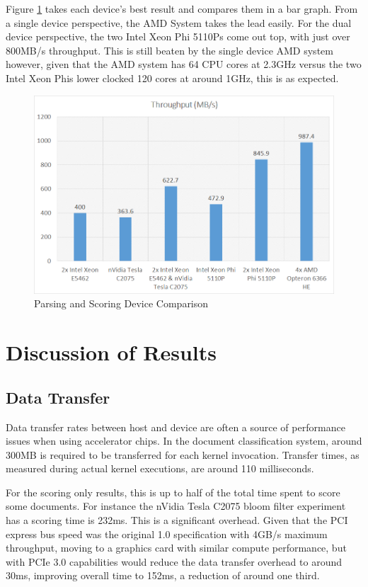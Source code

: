 Figure \ref{fig:parseScoringBest} takes each device's best result and compares
them in a bar graph. From a single device perspective, the AMD System takes the
lead easily. For the dual device perspective, the two Intel Xeon Phi 5110Ps come
out top, with just over 800MB/s throughput. This is still beaten by the single
device AMD system however, given that the AMD system has 64 CPU cores at 2.3GHz
versus the two Intel Xeon Phis lower clocked 120 cores at around 1GHz, this is
as expected.

\begin{figure}[H]
\centering
\includegraphics[width=\linewidth]{images/parsingScoringBest.png}
\caption{Parsing and Scoring Device Comparison}
\label{fig:parseScoringBest}
\end{figure}

\section{Discussion of Results}

\subsection{Data Transfer}

Data transfer rates between host and device are often a source of performance
issues when using accelerator chips. In the document classification system,
around 300MB is required to be transferred for each kernel invocation. Transfer
times, as measured during actual kernel executions, are around 110 milliseconds.

For the scoring only results, this is up to half of the total time spent to
score some documents. For instance the nVidia Tesla C2075 bloom filter
experiment has a scoring time is 232ms. This is a significant overhead. Given
that the PCI express bus speed was the original 1.0 specification with 4GB/s
maximum throughput, moving to a graphics card with similar compute performance,
but with PCIe 3.0 capabilities would reduce the data transfer overhead to
around 30ms, improving overall time to 152ms, a reduction of around one third.

